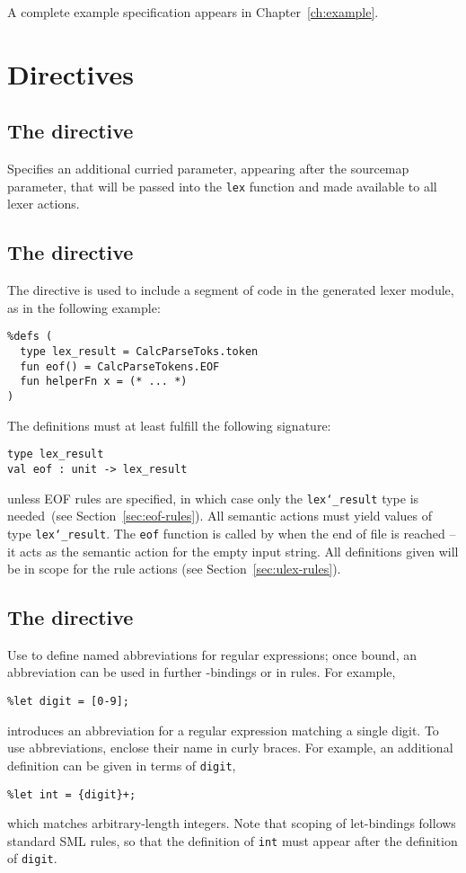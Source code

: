 A complete example specification appears in Chapter~\ref{ch:example}.

\section{Directives}

\subsection{The  directive}

Specifies an additional curried parameter, appearing after the sourcemap parameter, that will be passed into the \texttt{lex} function and made available to all lexer actions.

\subsection{The  directive}

The  directive is used to include a segment of code in the generated lexer module, as in the following example:
\begin{lstlisting}
%defs (
  type lex_result = CalcParseToks.token
  fun eof() = CalcParseTokens.EOF
  fun helperFn x = (* ... *)
)
\end{lstlisting}
The definitions must at least fulfill the following signature:
\begin{lstlisting}
type lex_result
val eof : unit -> lex_result
\end{lstlisting}
unless EOF rules are specified, in which case only the \texttt{lex\char`\_result} type is needed~(see Section~\ref{sec:eof-rules}).
All semantic actions must yield values of type \texttt{lex\char`\_result}.  The \texttt{eof} function is called by \ulex{} when the end of file is reached -- it acts as the semantic action for the empty input string.  All definitions given will be in scope for the rule actions (see Section~\ref{sec:ulex-rules}).

\subsection{The  directive}

Use  to define named abbreviations for regular expressions; once bound, an abbreviation can be used in further -bindings or in rules.  For example,
\begin{verbatim}
%let digit = [0-9];
\end{verbatim}
introduces an abbreviation for a regular expression matching a single digit.  To use abbreviations, enclose their name in curly braces.  For example, an additional  definition can be given in terms of \texttt{digit},
\begin{verbatim}
%let int = {digit}+;
\end{verbatim}
which matches arbitrary-length integers.  Note that scoping of let-bindings follows standard SML rules, so that the definition of \texttt{int} must appear after the definition of \texttt{digit}.

